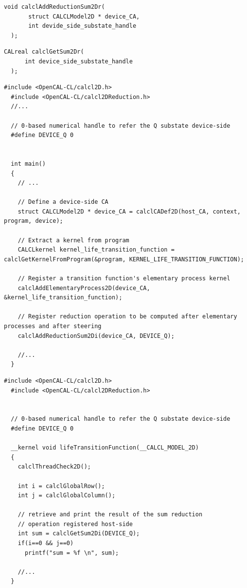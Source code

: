 \begin{lstlisting}[float, label=lst:calclAddReductionSum2Dr, caption=The calclAddReductionSum2Dr() host-side reduction registration function., numbers=none]
  void calclAddReductionSum2Dr(
       struct CALCLModel2D * device_CA,
       int devide_side_substate_handle
  );
\end{lstlisting}

\begin{lstlisting}[float, label=lst:calclGetSum2Dr, caption=The calclGetSum2Dr() device-side reduction retrieving function., numbers=none]
  CALreal calclGetSum2Dr(
      int device_side_substate_handle
  );
\end{lstlisting}


\begin{lstlisting}[float, label=lst:calcl_reduction_example_host, caption=An example of global reduction operation in a host-side OpenCAL-CL application.]
  #include <OpenCAL-CL/calcl2D.h>
  #include <OpenCAL-CL/calcl2DReduction.h>
  //...

  // 0-based numerical handle to refer the Q substate device-side
  #define DEVICE_Q 0

  
  int main()
  {
    // ...
    
    // Define a device-side CA
    struct CALCLModel2D * device_CA = calclCADef2D(host_CA, context, program, device);

    // Extract a kernel from program
    CALCLkernel kernel_life_transition_function = calclGetKernelFromProgram(&program, KERNEL_LIFE_TRANSITION_FUNCTION);

    // Register a transition function's elementary process kernel
    calclAddElementaryProcess2D(device_CA, &kernel_life_transition_function);

    // Register reduction operation to be computed after elementary processes and after steering
    calclAddReductionSum2Di(device_CA, DEVICE_Q);

    //...
  }
\end{lstlisting}


\begin{lstlisting}[float, label=lst:calcl_reduction_example_device, caption=An example of global reduction operation in a device-side OpenCAL-CL application.]
  #include <OpenCAL-CL/calcl2D.h>
  #include <OpenCAL-CL/calcl2DReduction.h>
  

  // 0-based numerical handle to refer the Q substate device-side
  #define DEVICE_Q 0

  __kernel void lifeTransitionFunction(__CALCL_MODEL_2D)
  {
    calclThreadCheck2D();
    
    int i = calclGlobalRow();
    int j = calclGlobalColumn();

    // retrieve and print the result of the sum reduction
    // operation registered host-side
    int sum = calclGetSum2Di(DEVICE_Q);
    if(i==0 && j==0) 	
      printf("sum = %f \n", sum);

    //...
  } 
\end{lstlisting}
